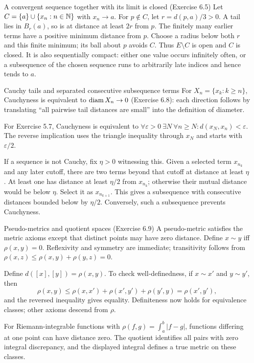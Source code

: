 \begin{note}{A convergent sequence together with its limit is closed (Exercise 6.5)}
Let $C=\{a\}\cup\{x_n:n\in\mathbb N\}$ with $x_n\to a$. For $p\notin C$, let $r=d(p,a)/3>0$. A tail lies in $B_r(a)$, so is at distance at least $2r$ from $p$. The finitely many earlier terms have a positive minimum distance from $p$. Choose a radius below both $r$ and this finite minimum; its ball about $p$ avoids $C$. Thus $E\setminus C$ is open and $C$ is closed. It is also sequentially compact: either one value occurs infinitely often, or a subsequence of the chosen sequence runs to arbitrarily late indices and hence tends to $a$.
\end{note}
\begin{note}{Cauchy tails and separated consecutive subsequence terms}
For $X_n=\{x_k:k\ge n\}$, Cauchyness is equivalent to $\operatorname{diam} X_n\to0$ (Exercise 6.8): each direction follows by translating ``all pairwise tail distances are small'' into the definition of diameter.

For Exercise 5.7, Cauchyness is equivalent to $\forall\varepsilon>0\ \exists N\ \forall n\ge N:d(x_N,x_n)<\varepsilon$. The reverse implication uses the triangle inequality through $x_N$ and starts with $\varepsilon/2$.

If a sequence is not Cauchy, fix $\eta>0$ witnessing this. Given a selected term $x_{n_k}$ and any later cutoff, there are two terms beyond that cutoff at distance at least $\eta$. At least one has distance at least $\eta/2$ from $x_{n_k}$; otherwise their mutual distance would be below $\eta$. Select it as $x_{n_{k+1}}$. This gives a subsequence with consecutive distances bounded below by $\eta/2$. Conversely, such a subsequence prevents Cauchyness.
\end{note}
\begin{note}{Pseudo-metrics and quotient spaces (Exercise 6.9)}
A pseudo-metric satisfies the metric axioms except that distinct points may have zero distance. Define $x\sim y$ iff $\rho(x,y)=0$. Reflexivity and symmetry are immediate; transitivity follows from $\rho(x,z)\le\rho(x,y)+\rho(y,z)=0$.

Define $d([x],[y])=\rho(x,y)$. To check well-definedness, if $x\sim x'$ and $y\sim y'$, then
\[\rho(x,y)\le\rho(x,x')+\rho(x',y')+\rho(y',y)=\rho(x',y'),\]
and the reversed inequality gives equality. Definiteness now holds for equivalence classes; other axioms descend from $\rho$.

For Riemann-integrable functions with $\rho(f,g)=\int_a^b|f-g|$, functions differing at one point can have distance zero. The quotient identifies all pairs with zero integral discrepancy, and the displayed integral defines a true metric on these classes.
\end{note}

